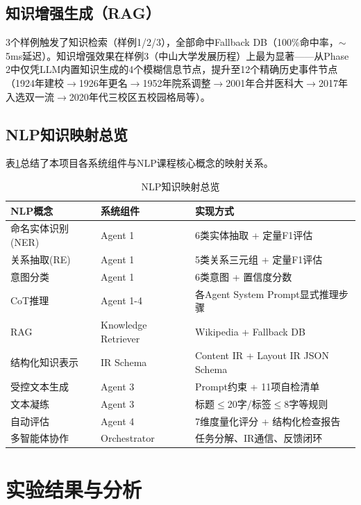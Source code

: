 \documentclass[11pt,a4paper]{article}
\begin{document}
\subsection{知识增强生成（RAG）}

3个样例触发了知识检索（样例1/2/3），全部命中Fallback DB（100\%命中率，$\sim$5ms延迟）。知识增强效果在样例3（中山大学发展历程）上最为显著——从Phase 2中仅凭LLM内置知识生成的4个模糊信息节点，提升至12个精确历史事件节点（1924年建校$\rightarrow$1926年更名$\rightarrow$1952年院系调整$\rightarrow$2001年合并医科大$\rightarrow$2017年入选双一流$\rightarrow$2020年代三校区五校园格局等）。

\subsection{NLP知识映射总览}

表\ref{tab:nlp_map}总结了本项目各系统组件与NLP课程核心概念的映射关系。

\begin{table}[H]
\centering
\caption{NLP知识映射总览}
\label{tab:nlp_map}
\begin{tabular}{lll}
\toprule
NLP概念 & 系统组件 & 实现方式 \\
\midrule
命名实体识别(NER) & Agent 1 & 6类实体抽取 + 定量F1评估 \\
关系抽取(RE) & Agent 1 & 5类关系三元组 + 定量F1评估 \\
意图分类 & Agent 1 & 6类意图 + 置信度分数 \\
CoT推理 & Agent 1-4 & 各Agent System Prompt显式推理步骤 \\
RAG & Knowledge Retriever & Wikipedia + Fallback DB \\
结构化知识表示 & IR Schema & Content IR + Layout IR JSON Schema \\
受控文本生成 & Agent 3 & Prompt约束 + 11项自检清单 \\
文本凝练 & Agent 3 & 标题$\le$20字/标签$\le$8字等规则 \\
自动评估 & Agent 4 & 7维度量化评分 + 结构化检查报告 \\
多智能体协作 & Orchestrator & 任务分解、IR通信、反馈闭环 \\
\bottomrule
\end{tabular}
\end{table}

\section{实验结果与分析}
\end{document}
